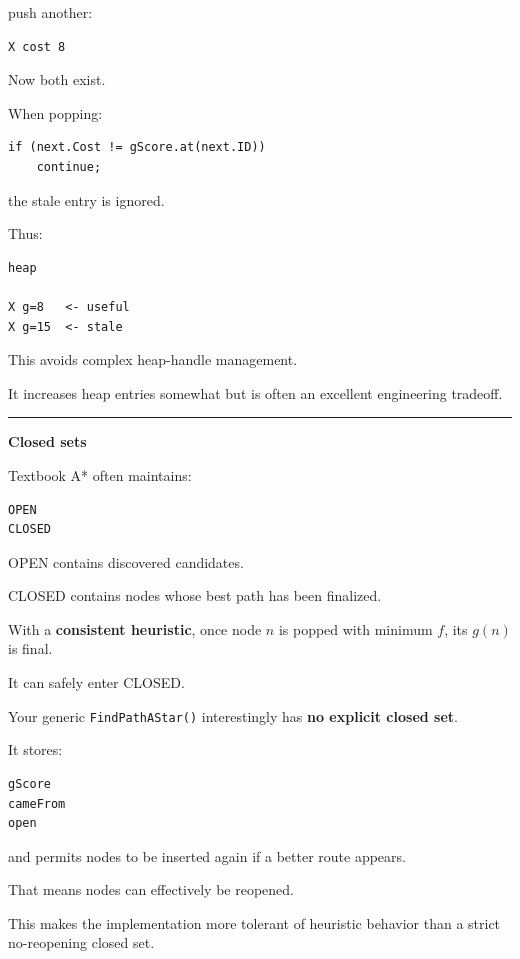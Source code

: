 push another:

\begin{verbatim}
X cost 8
\end{verbatim}

Now both exist.

When popping:

\begin{verbatim}
if (next.Cost != gScore.at(next.ID))
    continue;
\end{verbatim}

the stale entry is ignored.

Thus:

\begin{verbatim}
heap

X g=8   <- useful
X g=15  <- stale
\end{verbatim}

This avoids complex heap-handle management.

It increases heap entries somewhat but is often an excellent engineering tradeoff.

\begin{center}\rule{0.5\linewidth}{0.5pt}\end{center}

\textbf{Closed sets}

Textbook A* often maintains:

\begin{verbatim}
OPEN
CLOSED
\end{verbatim}

OPEN contains discovered candidates.

CLOSED contains nodes whose best path has been finalized.

With a \textbf{consistent heuristic}, once node \(n\) is popped with minimum \(f\), its \(g(n)\) is final.

It can safely enter CLOSED.

Your generic \texttt{FindPathAStar()} interestingly has \textbf{no explicit closed set}.

It stores:

\begin{verbatim}
gScore
cameFrom
open
\end{verbatim}

and permits nodes to be inserted again if a better route appears.

That means nodes can effectively be reopened.

This makes the implementation more tolerant of heuristic behavior than a strict no-reopening closed set.

